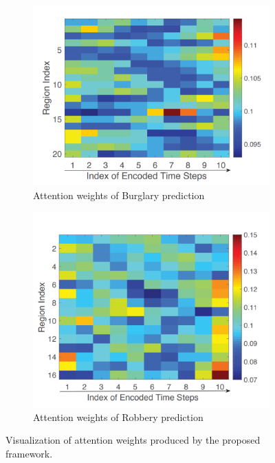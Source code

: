 \begin{figure}[!htb]
    \captionsetup[subfigure]{font=small,labelfont=small}
    \centering
    \begin{subfigure}{0.45\textwidth}
        \centering
        \includegraphics[width=0.9\linewidth]{Chapter5/Images/visual/a.png} 
        \caption{Attention weights of Burglary prediction}
        \label{fig:v1}
    \end{subfigure}
    \begin{subfigure}{0.45\textwidth}
        \centering
        \includegraphics[width=0.85\linewidth]{Chapter5/Images/visual/b.png}
        \caption{Attention weights of Robbery prediction}
        \label{fig:v2}
    \end{subfigure}

    \caption{Visualization of attention weights produced by the proposed framework.}
    \label{fig:img5}
\end{figure}